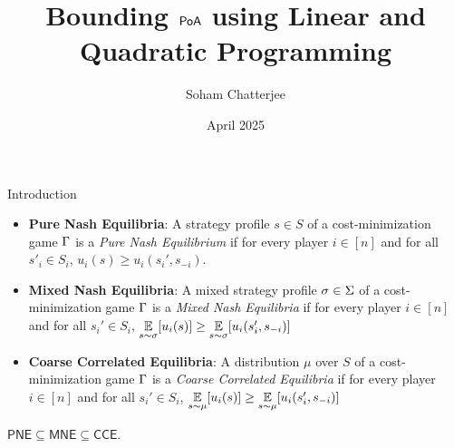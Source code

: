 \documentclass[aspectratio=1610]{beamer}
\title{Bounding $\operatorname{\mathsf{PoA}}$ using Linear and Quadratic Programming}
\date{April 2025}
\author{Soham Chatterjee}
\begin{document}
\begin{frame}
	\titlepage
\end{frame}


\begin{frame}{Introduction}
	\begin{itemize}
        \item \textbf{Pure Nash Equilibria}: A strategy profile $s\in S$ of a cost-minimization game $\Gamma$ is a \textit{Pure Nash Equilibrium} if for every player $i\in[n]$ and for all $s'_i\in S_i$, $u_i(s)\geq u_i(s_i',s_{-i})$.
        \item \textbf{Mixed Nash Equilibria}: A mixed strategy profile $\sigma\in \Sigma$ of a cost-minimization game $\Gamma$ is a \textit{Mixed Nash Equilibria} if for every player $i\in[n]$ and for all $s_i'\in S_i$, $\underset{s\sim \sigma}{\mathbb{E}}[u_i(s)]\geq \underset{s\sim \sigma}{\mathbb{E}}[u_i(s_i',s_{-i})]$
        \item \textbf{Coarse Correlated Equilibria}: A distribution $\mu$ over $S$ of a cost-minimization game $\Gamma$ is a \textit{Coarse Correlated Equilibria} if for every player $i\in[n]$ and for all $s_i'\in S_i$, $\underset{s\sim \mu}{\mathbb{E}}[u_i(s)]\geq \underset{s\sim \mu}{\mathbb{E}}[u_i(s_i',s_{-i})]$
    \end{itemize}\vspace*{5mm}\pause

    $\textsf{PNE}\subseteq \textsf{MNE}\subseteq \textsf{CCE}$.
\end{frame}
\end{document}
